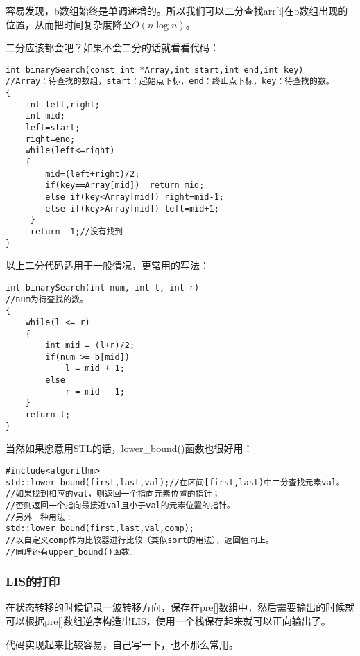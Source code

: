 容易发现，b数组始终是单调递增的。所以我们可以二分查找arr[i]在b数组出现的位置，从而把时间复杂度降至$O(n\log n)$。

二分应该都会吧？如果不会二分的话就看看代码：

\begin{verbatim}
int binarySearch(const int *Array,int start,int end,int key)
//Array：待查找的数组，start：起始点下标，end：终止点下标，key：待查找的数。
{
    int left,right;
    int mid;
    left=start;
    right=end;
    while(left<=right)
    {
        mid=(left+right)/2;
        if(key==Array[mid])  return mid;
        else if(key<Array[mid]) right=mid-1;
        else if(key>Array[mid]) left=mid+1;    
     }
     return -1;//没有找到
}
\end{verbatim}

以上二分代码适用于一般情况，更常用的写法：
\begin{verbatim}
int binarySearch(int num, int l, int r)
//num为待查找的数。
{    
    while(l <= r)    
    {    
        int mid = (l+r)/2;    
        if(num >= b[mid])    
            l = mid + 1;    
        else  
            r = mid - 1;    
    }    
    return l;
}
\end{verbatim}

当然如果愿意用STL的话，lower\_bound()函数也很好用：

\begin{verbatim}
#include<algorithm>
std::lower_bound(first,last,val);//在区间[first,last)中二分查找元素val。
//如果找到相应的val，则返回一个指向元素位置的指针；
//否则返回一个指向最接近val且小于val的元素位置的指针。
//另外一种用法：
std::lower_bound(first,last,val,comp);
//以自定义comp作为比较器进行比较（类似sort的用法），返回值同上。
//同理还有upper_bound()函数。
\end{verbatim}
\subsubsection{LIS的打印}
在状态转移的时候记录一波转移方向，保存在pre[]数组中，然后需要输出的时候就可以根据pre[]数组逆序构造出LIS，使用一个栈保存起来就可以正向输出了。

代码实现起来比较容易，自己写一下，也不那么常用。
